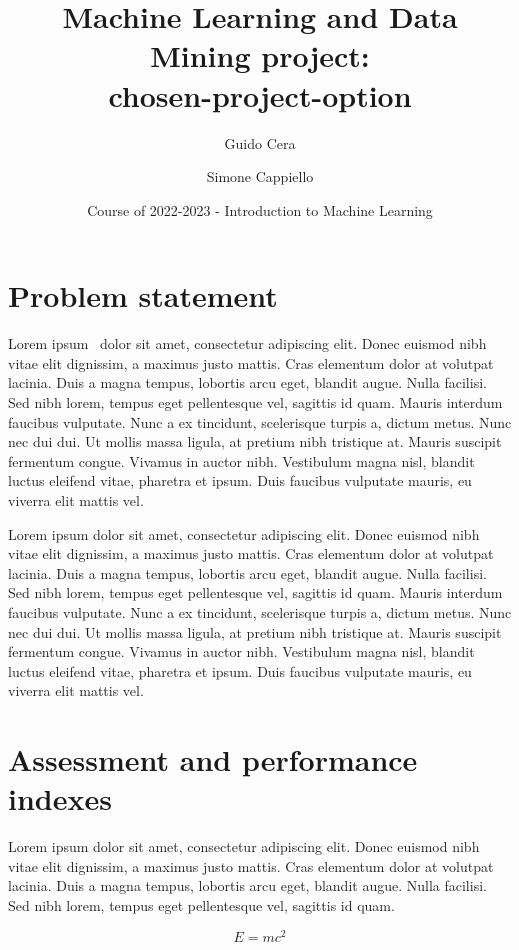 \documentclass{article}
\title{Machine Learning and Data Mining project:\\chosen-project-option}
\author[1]{Guido Cera}
\author[2]{Simone Cappiello}
\affil[1]{
    problem statement,
    solution design,
    solution development,
    data gathering,
    writing
}
\affil[2]{
    problem statement,
    solution design,
    solution development,
    data gathering,
    writing
}
\date{Course of 2022-2023 - Introduction to Machine Learning}
\begin{document}
\maketitle



\section{Problem statement}
Lorem ipsum~\cite{scikit-learn} dolor sit amet, consectetur adipiscing elit.
Donec euismod nibh vitae elit dignissim, a maximus justo mattis.
Cras elementum dolor at volutpat lacinia.
Duis a magna tempus, lobortis arcu eget, blandit augue.
Nulla facilisi.
Sed nibh lorem, tempus eget pellentesque vel, sagittis id quam.
Mauris interdum faucibus vulputate.
Nunc a ex tincidunt, scelerisque turpis a, dictum metus.
Nunc nec dui dui.
Ut mollis massa ligula, at pretium nibh tristique at.
Mauris suscipit fermentum congue.
Vivamus in auctor nibh.
Vestibulum magna nisl, blandit luctus eleifend vitae, pharetra et ipsum.
Duis faucibus vulputate mauris, eu viverra elit mattis vel.

Lorem ipsum dolor sit amet, consectetur adipiscing elit.
Donec euismod nibh vitae elit dignissim, a maximus justo mattis.
Cras elementum dolor at volutpat lacinia.
Duis a magna tempus, lobortis arcu eget, blandit augue.
Nulla facilisi.
Sed nibh lorem, tempus eget pellentesque vel, sagittis id quam.
Mauris interdum faucibus vulputate.
Nunc a ex tincidunt, scelerisque turpis a, dictum metus.
Nunc nec dui dui.
Ut mollis massa ligula, at pretium nibh tristique at.
Mauris suscipit fermentum congue.
Vivamus in auctor nibh.
Vestibulum magna nisl, blandit luctus eleifend vitae, pharetra et ipsum.
Duis faucibus vulputate mauris, eu viverra elit mattis vel.



\section{Assessment and performance indexes}
Lorem ipsum dolor sit amet, consectetur adipiscing elit.
Donec euismod nibh vitae elit dignissim, a maximus justo mattis.
Cras elementum dolor at volutpat lacinia.
Duis a magna tempus, lobortis arcu eget, blandit augue.
Nulla facilisi.
Sed nibh lorem, tempus eget pellentesque vel, sagittis id quam.

\begin{equation}
    E=mc^2
\end{equation}
\end{document}
